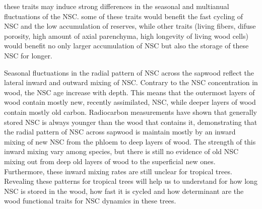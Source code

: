 \documentclass{article}
\begin{document}
these traits may induce strong differences in the seasonal and multianual fluctuations of the NSC. 
some of these traits would benefit the fast cycling of NSC and the low accumulation of reserves, while other traits (living fibers, difuse porosity, high amount of axial parenchyma, high longevity of living wood cells) would benefit no only larger accumulation of NSC but also the storage of these NSC for longer. 


%

Seasonal fluctuations in the radial pattern of NSC across the sapwood reflect the lateral inward and outward mixing of NSC. Contrary to the NSC concentration in wood, the NSC age increase with depth. 
This means that the outermost layers of wood contain mostly new, recently assimilated, NSC, while deeper layers of wood contain mostly old carbon. 
Radiocarbon measurements have shown that generally stored NSC is always younger than the wood that contains it, demonstrating that the radial pattern of NSC across sapwood is maintain mostly by an inward mixing of new NSC from the phloem to deep layers of wood. 
The strength of this inward mixing vary among species, but there is still no evidence of old NSC mixing out from deep old layers of wood to the superficial new ones. Furthermore, these inward mixing rates are still unclear for tropical trees. 
Revealing these patterns for tropical trees will help us to understand for how long NSC is stored in the wood, how fast it is cycled and how determinant are the wood functional traits for NSC dynamics in these trees.
\end{document}
